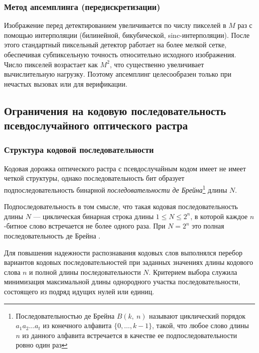 \subsubsection{Метод апсемплинга (передискретизации) \cite{phase_matching_sampling}}

Изображение перед детектированием увеличивается по числу пикселей в $M$ раз
с помощью интерполяции (билинейной, бикубической, sinc-интерполяции). После этого
стандартный пиксельный детектор работает на более мелкой сетке, обеспечивая
субпиксельную точность относительно исходного изображения. Число пикселей возрастает
как $M^2$, что существенно увеличивает вычислительную нагрузку. Поэтому апсемплинг
целесообразен только при нечастых вызовах или для верификации.

\subsection{Ограничения на кодовую последовательность псевдослучайного оптического растра}
\label{sec:pseudorand_code_constraints}

\subsubsection{Структура кодовой последовательности}\label{subsubsec:code_structure}

Кодовая дорожка оптического растра с псевдослучайным кодом имеет не имеет четкой структуры, однако последовательность бит образует подпоследовательность бинарной \textit{последовательности де Брейна}\footnote{Последовательностью де Брейна $B(k,~n)$ называют циклический порядок $a_1a_2\ldots a_t$ из конечного алфавита $\{0,\ldots, k-1\}$, такой, что любое слово длины $n$ из данного алфавита встречается в качестве ее подпоследовательности ровно один раз} длины $N$. 

Подпоследовательность в том смысле, что такая кодовая последовательность длины $N$ --- циклическая бинарная строка длины $1 \leq N \leq 2^n$, в которой каждое $n$-битное слово встречается не более одного раза. При $N = 2^n$ это полная последовательность де Брейна \cite{debruijn_cutdown}.

Для повышения надежности распознавания кодовых слов выполнялся перебор вариантов кодовых последовательностей при заданных значениях длины кодового слова $n$ и полной длины последовательности $N$. Критерием выбора служила минимизация максимальной длины однородного участка последовательности, состоящего из подряд идущих нулей или единиц.

